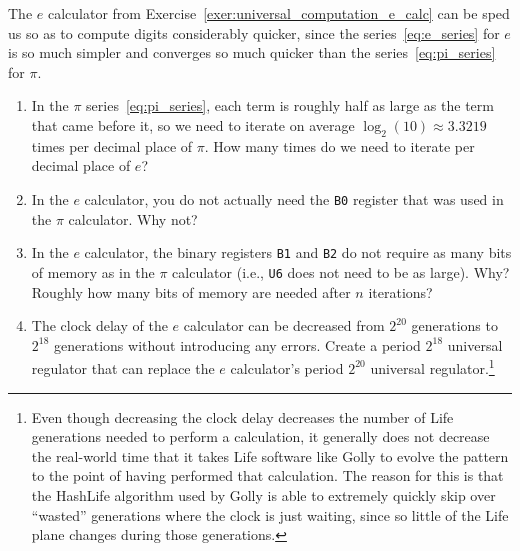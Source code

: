 \begin{multicols}{2}
\mfilbreak


\begin{problem}\label{exer:universal_computation_fast_e_calc}
	The $e$ calculator from Exercise~\ref{exer:universal_computation_e_calc} can be sped us so as to compute digits considerably quicker, since the series~\eqref{eq:e_series} for $e$ is so much simpler and converges so much quicker than the series~\eqref{eq:pi_series} for $\pi$.
	
	\begin{enumerate}[label=\bf\color{ocre}(\alph*)]
		\item In the $\pi$ series~\eqref{eq:pi_series}, each term is roughly half as large as the term that came before it, so we need to iterate on average $\log_2(10) \approx 3.3219$ times per decimal place of $\pi$. How many times do we need to iterate per decimal place of $e$?
		
		\item In the $e$ calculator, you do not actually need the \texttt{B0} register that was used in the $\pi$ calculator. Why not?
		
		\item In the $e$ calculator, the binary registers \texttt{B1} and \texttt{B2} do not require as many bits of memory as in the $\pi$ calculator (i.e., \texttt{U6} does not need to be as large). Why? Roughly how many bits of memory are needed after $n$ iterations?
		
		\item The  clock delay of the $e$ calculator can be decreased from $2^{20}$ generations to $2^{18}$ generations without introducing any errors. Create a period $2^{18}$ universal regulator that can replace the $e$ calculator's period $2^{20}$ universal regulator.\footnote{Even though decreasing the clock delay decreases the number of Life generations needed to perform a calculation, it generally does not decrease the real-world time that it takes Life software like Golly to evolve the pattern to the point of having performed that calculation. The reason for this is that the HashLife algorithm used by Golly is able to extremely quickly skip over ``wasted'' generations where the clock is just waiting, since so little of the Life plane changes during those generations.}
		

\end{enumerate}
\end{problem}
\end{multicols}
